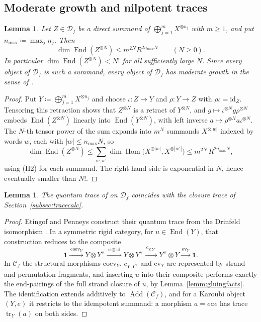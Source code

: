 \documentclass[11pt]{article}
\newtheorem{lemm}[theo]{Lemma}
\newcommand{\conncat}{\mathcal{C}_{f}}            %
\newcommand{\cauchy}{\mathcal{D}_{f}}             %
\newcommand{\unitobj}{\mathbf{1}}                 %
\newcommand{\genX}{X}                             %
\newcommand{\Add}{\operatorname{Add}}
\newcommand{\End}{\operatorname{End}}
\newcommand{\Hom}{\operatorname{Hom}}
\newcommand{\tr}{\operatorname{tr}}
\begin{document}
\subsection{Moderate growth and nilpotent traces}
\label{subsec:growth}

\begin{lemm}\label{lemm:growthD}
Let $Z\in\cauchy$ be a direct summand of
$\bigoplus_{j=1}^{m}\genX^{\otimes n_{j}}$ with $m\ge1$, and put
$n_{\max}\coloneqq\max_{j}n_{j}$. Then
\[
\dim\End(Z^{\otimes N})\le m^{2N}R^{2n_{\max}N}
\qquad(N\ge 0).
\]
In particular $\dim\End(Z^{\otimes N})<N!$ for all sufficiently
large $N$. Since every object of $\cauchy$ is such a summand, every
object of $\cauchy$ has moderate growth in the sense of
\cite{EP26}.
\end{lemm}

\begin{proof}
Put $Y\coloneqq\bigoplus_{j=1}^{m}\genX^{\otimes n_{j}}$ and
choose $\iota\colon Z\to Y$ and $\rho\colon Y\to Z$ with
$\rho\iota=\mathrm{id}_{Z}$. Tensoring this retraction shows that
$Z^{\otimes N}$ is a retract of $Y^{\otimes N}$, and
$g\mapsto\iota^{\otimes N}g\rho^{\otimes N}$ embeds
$\End(Z^{\otimes N})$ linearly into $\End(Y^{\otimes N})$, with
left inverse $a\mapsto\rho^{\otimes N}a\iota^{\otimes N}$. The
$N$-th tensor power of the sum expands into $m^{N}$ summands
$\genX^{\otimes|w|}$ indexed by words $w$, each with
$|w|\le n_{\max}N$, so
\[
\dim\End(Z^{\otimes N})
\le\sum_{w,w'}\dim\Hom\bigl(\genX^{\otimes|w|},
\genX^{\otimes|w'|}\bigr)
\le m^{2N}\,R^{2n_{\max}N},
\]
using (H2) for each summand. The right-hand side is exponential in
$N$, hence eventually smaller than $N!$.
\end{proof}

\begin{lemm}\label{lemm:qtrace}
The quantum trace of \cite{EP26} on $\cauchy$ coincides with the
closure trace of Section~\ref{subsec:tracecalc}.
\end{lemm}

\begin{proof}
Etingof and Penneys construct their quantum trace from the
Drinfeld isomorphism \cite[\S2.3]{EP26}. In a symmetric rigid
category, for $u\in\End(Y)$, that construction reduces to the
composite
\[
\unitobj
\xrightarrow{\ \mathrm{coev}_{Y}\ }
Y\otimes Y^{\vee}
\xrightarrow{\ u\otimes\mathrm{id}\ }
Y\otimes Y^{\vee}
\xrightarrow{\ c_{Y,Y^{\vee}}\ }
Y^{\vee}\otimes Y
\xrightarrow{\ \mathrm{ev}_{Y}\ }
\unitobj .
\]
In $\conncat$ the structural morphisms $\mathrm{coev}_{Y}$,
$c_{Y,Y^{\vee}}$ and $\mathrm{ev}_{Y}$ are represented by strand
and permutation fragments, and inserting $u$ into their composite
performs exactly the end-pairings of the full strand closure of
$u$, by Lemma~\ref{lemm:gluingfacts}. The identification extends
additively to $\Add(\conncat)$, and for a Karoubi object $(Y,e)$
it restricts to the idempotent summand: a morphism $a=eae$ has
trace $\tr_{Y}(a)$ on both sides.
\end{proof}
\end{document}
